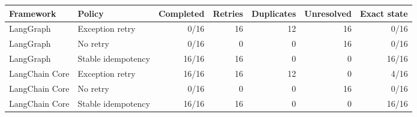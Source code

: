 \begin{tabular}{llrrrrr}
\toprule
Framework & Policy & Completed & Retries & Duplicates & Unresolved & Exact state \\
\midrule
LangGraph & Exception retry & 0/16 & 16 & 12 & 16 & 0/16 \\
LangGraph & No retry & 0/16 & 0 & 0 & 16 & 0/16 \\
LangGraph & Stable idempotency & 16/16 & 16 & 0 & 0 & 16/16 \\
\addlinespace
LangChain Core & Exception retry & 16/16 & 16 & 12 & 0 & 4/16 \\
LangChain Core & No retry & 0/16 & 0 & 0 & 16 & 0/16 \\
LangChain Core & Stable idempotency & 16/16 & 16 & 0 & 0 & 16/16 \\
\bottomrule
\end{tabular}
